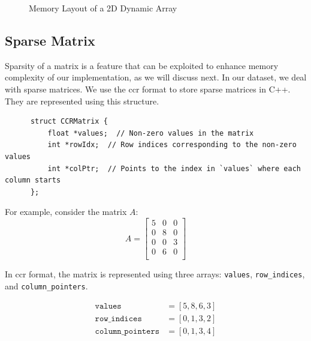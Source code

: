 \begin{figure}[h]
    \centering
    \caption{Memory Layout of a 2D Dynamic Array}
\end{figure}


\subsection{Sparse Matrix}\label{subsubsection:sparse-matrix}
Sparsity of a matrix is a feature that can be exploited to
enhance memory complexity of our implementation, as we will discuss next.
In our dataset, we deal with sparse matrices.
We use the \gls{ccr} format to store sparse matrices in C++. They are represented using this
structure.

\begin{verbatim}
      struct CCRMatrix {
          float *values;  // Non-zero values in the matrix
          int *rowIdx;  // Row indices corresponding to the non-zero values
          int *colPtr;  // Points to the index in `values` where each column starts
      };
\end{verbatim}

For example, consider the matrix \( A \):
\[
    A =
    \begin{bmatrix}
        5 & 0 & 0 \\
        0 & 8 & 0 \\
        0 & 0 & 3 \\
        0 & 6 & 0 \\
    \end{bmatrix}
\]

In \gls{ccr} format, the matrix is represented using three arrays:
\texttt{values}, \texttt{row\_indices}, and \texttt{column\_pointers}.

\begin{align*}
    \texttt{values}           & = [5, 8, 6, 3] \\
    \texttt{row\_indices}     & = [0, 1, 3, 2] \\
    \texttt{column\_pointers} & = [0, 1, 3, 4] \\
\end{align*}


